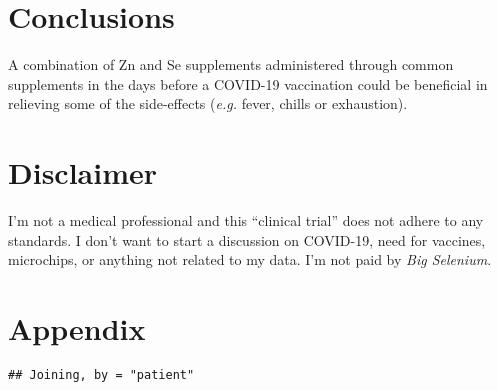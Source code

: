 \documentclass[
]{article}
\begin{document}
\hypertarget{conclusions}{%
\section{Conclusions}\label{conclusions}}

A combination of Zn and Se supplements administered through common
supplements in the days before a COVID-19 vaccination could be
beneficial in relieving some of the side-effects (\emph{e.g.} fever,
chills or exhaustion).

\hypertarget{disclaimer}{%
\section{Disclaimer}\label{disclaimer}}

I'm not a medical professional and this ``clinical trial'' does not
adhere to any standards. I don't want to start a discussion on COVID-19,
need for vaccines, microchips, or anything not related to my data. I'm
not paid by \emph{Big Selenium}.

\hypertarget{appendix}{%
\section{Appendix}\label{appendix}}

\begin{verbatim}
## Joining, by = "patient"
\end{verbatim}
\end{document}
